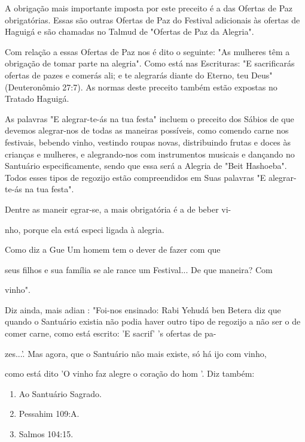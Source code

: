 \begin{itemize}
\begin{enumrate}
\begin{itemize}
\begin{itemize}
A obrigação mais importante imposta por este preceito é a das Ofer­tas
de Paz obrigatórias. Essas são outras Ofertas de Paz do Festival
adicionais às ofertas de Haguigá e são chamadas no Talmud de "Ofertas de
Paz da Alegria".

Com relação a essas Ofertas de Paz nos é dito o seguinte: "As mulhe­res
têm a obrigação de tomar parte na alegria". Como está nas Escrituras: "E
sacrificarás ofertas de pazes e comerás ali; e te alegrarás diante do
Eterno, teu Deus" (Deuteronômio 27:7). As normas deste preceito também
estão expostas no Tratado Haguigá.

As palavras "E alegrar-te-ás na tua festa" incluem o preceito dos
Sá­bios de que devemos alegrar-nos de todas as maneiras possíveis, como
comen­do carne nos festivais, bebendo vinho, vestindo roupas novas,
distribuindo frutas e doces às crianças e mulheres, e alegrando-nos com
instrumentos musicais e dançando no Santuário especificamente, sendo que
essa será a Alegria de "Beit Hashoeba". Todos esses tipos de regozijo
estão compreendidos em Suas pala­vras "E alegrar-te-ás na tua festa".

Dentre as maneir egrar-se, a mais obrigatória é a de beber vi-

nho, porque ela está especi ligada à alegria.

Como diz a Gue Um homem tem o dever de fazer com que

seus filhos e sua família se ale rance um Festival... De que maneira?
Com

vinho".

Diz ainda, mais adian : "Foi-nos ensinado: Rabi Yehudá ben Bete­ra diz
que quando o Santuário existia não podia haver outro tipo de regozijo a
não ser o de comer carne, como está escrito: 'E sacrif' 's ofertas de
pa-

zes...'. Mas agora, que o Santuário não mais existe, só há ijo com
vinho,

como está dito 'O vinho faz alegre o coração do hom '. Diz também:


\begin{enumerate}
\def\labelenumi{\arabic{enumi}.}
\setcounter{enumi}{70}
\item
 
 Ao Santuário Sagrado.
 
\item
 
 Pessahim 109:A.
 
\item
 
 Salmos 104:15.
 

\end{enumerate}
\end{itemize}
\end{itemize}
\end{enumrate}
\end{itemize}
